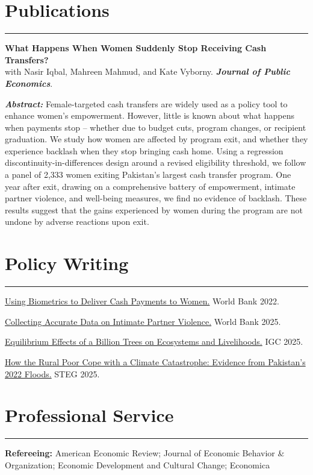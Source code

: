 \documentclass[10.5pt]{article}
\newcommand{\resumesection}[1]{\vspace{0.05cm}\section*{\large #1}\vspace{-0.2cm}\hrule\vspace{0.25cm}}
\newcommand{\paperabstract}[1]{%
  \vspace{.15cm}%
  \begin{list}{}{%
    \setlength{\leftmargin}{1.4em}%
    \setlength{\rightmargin}{0em}%
    \setlength{\topsep}{0pt}%
    \setlength{\partopsep}{0pt}%
    \setlength{\itemsep}{0pt}%
    \setlength{\parsep}{0pt}%
  }%
  \item[] {\small\textbf{\textit{Abstract:}} #1}%
  \end{list}%
  \vspace{.4cm}%
}
\begin{document}
\resumesection{Publications}

\textbf{{What Happens When Women Suddenly Stop Receiving Cash Transfers?}} \vspace*{.1cm} \\
with Nasir Iqbal, Mahreen Mahmud, and Kate Vyborny. \textbf{\textit{Journal of Public Economics}}.

\paperabstract{Female-targeted cash transfers are widely used as a policy tool to enhance women's empowerment. However, little is known about what happens when payments stop – whether due to budget cuts, program changes, or recipient graduation. We study how women are affected by program exit, and whether they experience backlash when they stop bringing cash home. Using a regression discontinuity-in-differences design around a revised eligibility threshold, we follow a panel of 2,333 women exiting Pakistan's largest cash transfer program. One year after exit, drawing on a comprehensive battery of empowerment, intimate partner violence, and well-being measures, we find no evidence of backlash. These results suggest that the gains experienced by women during the program are not undone by adverse reactions upon exit.}

\resumesection{Policy Writing}

\href{https://documents1.worldbank.org/curated/en/099155004142238180/pdf/P1763410d1e1af00108e170e5754d04fed9.pdf}{Using Biometrics to Deliver Cash Payments to Women.}  World Bank 2022.

\href{https://documents1.worldbank.org/curated/en/099406503032591629/pdf/IDU157126b0b1079f1483d18ce317cfccf04f886.pdf}{Collecting Accurate Data on Intimate Partner Violence.}  World Bank 2025.

\href{https://www.theigc.org/blogs/billion-tree-tsunami-afforestation-pakistan}{Equilibrium Effects of a Billion Trees on Ecosystems and Livelihoods.} IGC 2025.

\href{https://steg.cepr.org/sites/default/files/2025-04/PB024%20Simpson%20%28LRG%201646%29.pdf}{How the Rural Poor Cope with a Climate Catastrophe: Evidence from Pakistan's 2022 Floods.} STEG 2025.

\resumesection{Professional Service}
\textbf{Refereeing:} American Economic Review; Journal of Economic Behavior \& Organization; Economic Development and Cultural Change; Economica
\end{document}
